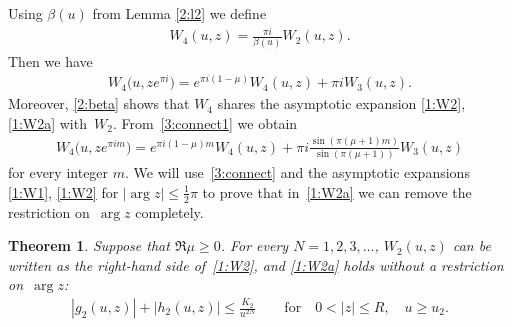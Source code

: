 \documentclass[pdftex]{sigma}
\numberwithin{equation}{section}
\newtheorem{Theorem}{Theorem}[section]
\begin{document}
Using $\beta(u)$ from Lemma \ref{2:l2} we def\/ine
\begin{gather*} W_4(u,z)=\frac{\pi i}{\beta(u)} W_2(u,z) .\end{gather*}
Then we have
\begin{gather}\label{3:connect1}
W_4\big(u,ze^{\pi i}\big)=e^{\pi i(1-\mu)} W_4(u,z)+\pi i W_3(u,z) .
\end{gather}
Moreover, \eqref{2:beta} shows that $W_4$ shares the asymptotic expansion \eqref{1:W2}, \eqref{1:W2a} with~$W_2$.
From~\eqref{3:connect1} we obtain
\begin{gather}\label{3:connect}
W_4\big(u,ze^{\pi im}\big)=e^{\pi i (1-\mu)m} W_4(u,z)+\pi i\frac{\sin(\pi(\mu+1)m)}{\sin(\pi(\mu+1))} W_3(u,z)
\end{gather}
for every integer $m$.
We will use~\eqref{3:connect} and the asymptotic expansions \eqref{1:W1}, \eqref{1:W2} for $|\arg z|\le \frac12\pi$
to prove that in~\eqref{1:W2a} we can remove the restriction on~$\arg z$ completely.

\begin{Theorem}\label{3:t1}
Suppose that $\Re\mu\ge0$. For every $N=1,2,3,\dots$, $W_2(u,z)$ can be written as the right-hand side of~\eqref{1:W2},
and \eqref{1:W2a} holds without a restriction on~$\arg z$:
\begin{gather*}%
|g_2(u,z)|+|h_2(u,z)|\le \frac{K_2}{u^{2N}}\qquad\text{for} \quad 0<|z|\le R, \quad u\ge u_2.
\end{gather*}
\end{Theorem}
\end{document}
